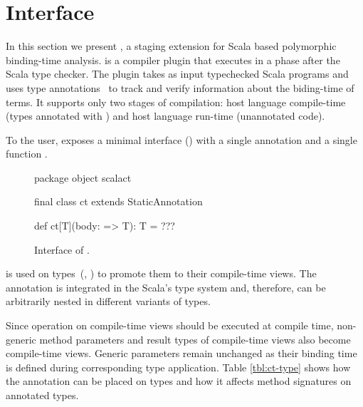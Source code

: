 \section{\tool Interface}
\label{sct:interface}

In this section we present \tool, a staging extension for Scala based polymorphic binding-time analysis.
 \tool is a compiler plugin that executes in a phase after the
 Scala type checker. The plugin takes as input typechecked Scala programs and uses
 type annotations~\cite{odersky_1996_putting} to track and verify information about the biding-time
 of terms. It supports only two stages of compilation: host language compile-time
 (types annotated with ) and host language run-time (unannotated code).

To the user, \tool exposes a minimal interface () with
a single annotation  and a single function .

\begin{figure}
\begin{listing}
package object scalact {
  final class ct extends StaticAnnotation

  def ct[T](body: => T): T = ???
}
\end{listing}
\label{fig:interface}
\caption{Interface of \tool.}
\end{figure}

 is used on types~(\eg,
) to promote them to their compile-time views. The
annotation is integrated in the Scala's type system and, therefore, can be
arbitrarily nested in different variants of types.

Since operation on compile-time views should be executed at compile time, non-generic
 method parameters and result types of compile-time views also become compile-time views.
 Generic parameters remain unchanged as their binding time is defined during corresponding
 type application. Table \ref{tbl:ct-type}
 shows how the  annotation can be placed on types and how it affects method
 signatures on annotated types.

